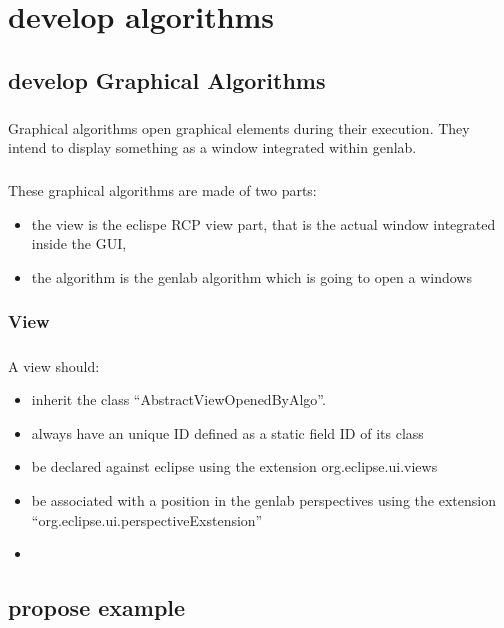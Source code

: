 \documentclass[a4paper,10pt]{book}
\begin{document}
\chapter{develop algorithms}

\section{develop Graphical Algorithms}

\paragraph*{}
Graphical algorithms open graphical elements during their execution. They intend to display something as a window integrated within genlab.

\paragraph*{}
These graphical algorithms are made of two parts:
\begin{itemize}
\item the view is the eclispe RCP view part, that is the actual window integrated inside the GUI,
\item the algorithm is the genlab algorithm which is going to open a windows
\end{itemize}

\subsection{View}

\paragraph*{}
A view should:
\begin{itemize}
 \item inherit the class ``AbstractViewOpenedByAlgo''.
\item always have an unique ID defined as a static field ID of its class
\item be declared against eclipse using the extension org.eclipse.ui.views
\item be associated with a position in the genlab perspectives using the extension ``org.eclipse.ui.perspectiveExstension''
\item 
\end{itemize}


\section{propose example}
\end{document}
